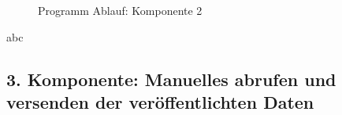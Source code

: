 \begin{center}
	\begin{figure}[h]
	 
	 \noindent{}
	 \caption[PAP komponente 2]{Programm Ablauf: Komponente 2}
	 \label{fig:lorareadwifisend}
	\end{figure}
\end{center}

abc

\newpage

\subsection{3. Komponente: Manuelles abrufen und versenden der veröffentlichten Daten} \label{PubSub}

